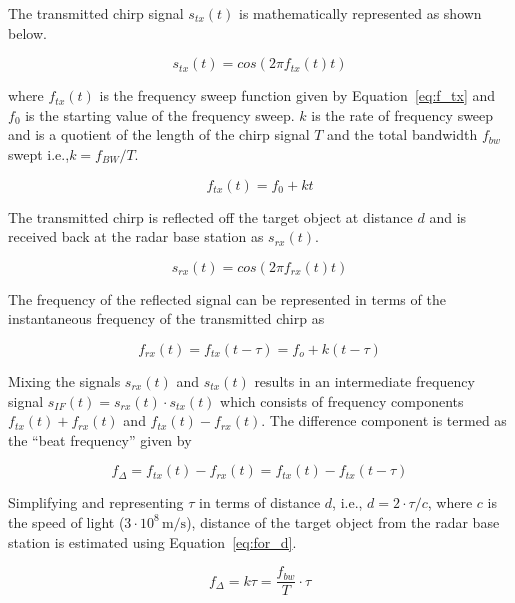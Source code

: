 \documentclass{sig-alternate-10pt}
\newcommand{\ie}{i.e.,\xspace}
\newcommand{\unit}[1]{\ensuremath{\, \mathrm{#1}}}
\begin{document}
The transmitted chirp signal $s_{tx}(t)$ is mathematically represented as
shown below.

\begin{equation}
  \label{eq:s_tx}
  s_{tx}(t) = cos(2\pi f_{tx}(t)t)
\end{equation}

where $f_{tx}(t)$ is the frequency sweep function given by
Equation~\eqref{eq:f_tx} and $f_0$ is the starting value of the frequency
sweep. $k$ is the rate of frequency sweep and is a quotient of the length of
the chirp signal $T$ and the total bandwidth $f_{bw}$ swept \ie $k=f_{BW}/T$.

\begin{equation}
  \label{eq:f_tx}
  f_{tx}(t) = f_0 + kt
\end{equation}

The transmitted chirp is reflected off the target object at distance $d$ and
is received back at the radar base station as $s_{rx}(t)$.

\begin{equation}
  \label{eq:s_rx}
  s_{rx}(t) = cos(2\pi f_{rx}(t)t)
\end{equation}

The frequency of the reflected signal can be represented in terms of the
instantaneous frequency of the transmitted chirp as

\begin{equation}
  \label{eq:9}
  f_{rx}(t) = f_{tx}(t-\tau) = f_o + k(t-\tau)
\end{equation}

Mixing the signals $s_{rx}(t)$ and $s_{tx}(t)$ results in an intermediate
frequency signal $s_{IF}(t)=s_{rx}(t)\cdot s_{tx}(t)$ which consists of
frequency components $f_{tx}(t)+f_{rx}(t)$ and $f_{tx}(t)-f_{rx}(t)$. The
difference component is termed as the ``beat frequency'' given by

\begin{equation}
  \label{eq:f_delta}
  f_{\Delta}=f_{tx}(t)-f_{rx}(t) = f_{tx}(t)-f_{tx}(t-\tau)
\end{equation}

Simplifying and representing $\tau$ in terms of distance $d$, \ie
$d=2\cdot\tau/c$, where $c$ is the speed of light ($3 \cdot 10^8\unit{m/s}$),
distance of the target object from the radar base station is estimated using
Equation~\eqref{eq:for_d}.

\begin{equation}
  \label{eq:f_delta_expand}
  f_{\Delta}=k\tau = \frac{f_{bw}}{T} \cdot \tau
\end{equation}
\end{document}
